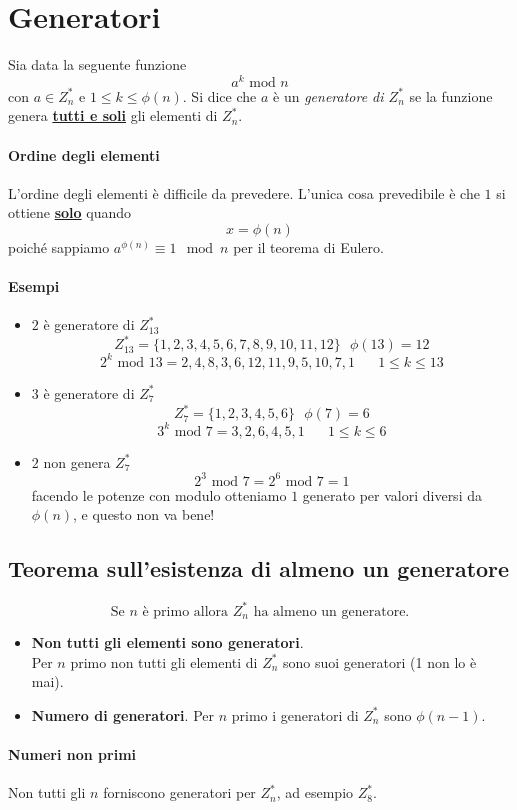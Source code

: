 \section{Generatori}
Sia data la seguente funzione
$$ a^k \text{ mod } n $$
con $a \in Z_{n}^*$ e $1 \leq k \leq \phi(n)$. Si dice che $a$ è un \emph{generatore di $Z_{n}^*$} se la funzione genera \textbf{\underline{{tutti e soli}}} gli elementi di $Z_{n}^*$.
\paragraph{Ordine degli elementi} L'ordine degli elementi è difficile da prevedere. L'unica cosa prevedibile è che $1$ si ottiene \textbf{\underline{solo}} quando $$x = \phi(n)$$ poiché sappiamo $a^{\phi(n)} \equiv 1 \mod n$ per il teorema di Eulero.  
\paragraph{Esempi}
\begin{itemize}
	\item $2$ è generatore di $Z_{13}^*$
	$$Z_{13}^*=\{1,2,3,4,5,6,7,8,9,10,11,12\}\,\,\,\,\phi(13)=12$$
	$$2^k \text{ mod } 13=2,4,8,3,6,12,11,9,5,10,7,1\,\,\,\,\,\,\,\,\,\,1\leq k \leq 13$$
	\item $3$ è generatore di $Z_7^*$ 
	$$Z_7^*=\{1,2,3,4,5,6\}\,\,\,\,\phi(7)=6$$
	$$3^k \text{ mod } 7=3,2,6,4,5,1\,\,\,\,\,\,\,\,\,\,1\leq k \leq 6$$
	\item $2$ non genera $Z_7^*$
	$$2^3 \text{ mod } 7 = 2^6 \text{ mod }7=1$$
	facendo le potenze con modulo otteniamo $1$ generato per valori diversi da $\phi(n)$, e questo non va bene!
\end{itemize} 
\subsection{Teorema sull'esistenza di almeno un generatore} 
\[\text{Se $n$ è primo allora $Z_{n}^*$ ha almeno un generatore.}\]
\begin{itemize}
	\item \textbf{{Non tutti gli elementi sono generatori}}.\\Per $n$ primo non tutti gli elementi di $Z_n^*$ sono suoi generatori (1 non lo è mai).
	\item \textbf{Numero di generatori}. Per $n$ primo i generatori di $Z_n^*$ sono $\phi(n-1)$.
\end{itemize}
\paragraph{Numeri non primi} Non tutti gli $n$ forniscono generatori per $Z_{n}^*$, ad esempio $Z_8^*$.

